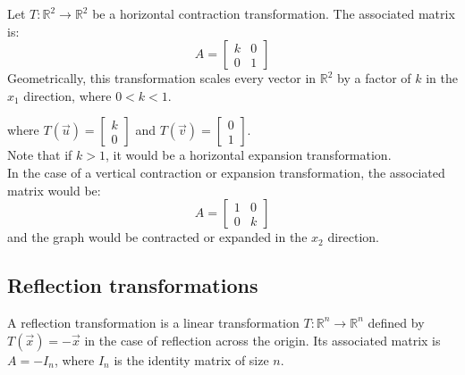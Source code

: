 \begin{eg}
    Let $T: \mathbb{R}^2 \to \mathbb{R}^2$ be a horizontal contraction transformation. The associated matrix is:
    \[
        A = \begin{bmatrix} k & 0 \\ 0 & 1 \end{bmatrix}
    \]
    Geometrically, this transformation scales every vector in $\mathbb{R}^2$ by a factor of $k$ in the $x_1$ direction, where $0 < k < 1$. \\
    \begin{center}
    \end{center}
    where $T(\vec{u}) = \begin{bmatrix} k \\ 0 \end{bmatrix}$ and $T(\vec{v}) = \begin{bmatrix} 0 \\ 1 \end{bmatrix}$. \\
    Note that if $k > 1$, it would be a horizontal expansion transformation. \\
    In the case of a vertical contraction or expansion transformation, the associated matrix would be:
    \[
        A = \begin{bmatrix} 1 & 0 \\ 0 & k \end{bmatrix}
    \]
    and the graph would be contracted or expanded in the $x_2$ direction.
\end{eg}

\subsection{Reflection transformations}
\begin{definition}
    A reflection transformation is a linear transformation $T: \mathbb{R}^n \to \mathbb{R}^n$ defined by $T(\vec{x}) = -\vec{x}$ in the case of reflection across the origin. Its associated matrix is $A = -I_n$, where $I_n$ is the identity matrix of size $n$.
\end{definition}


